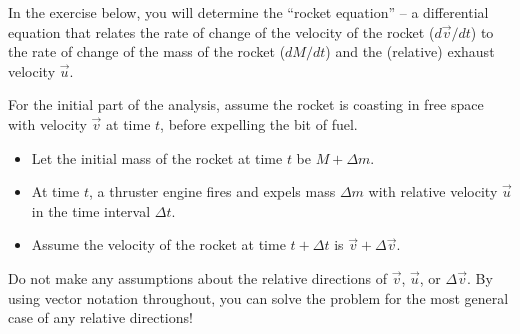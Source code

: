 \documentclass[11pt, letterpaper, openany]{book}
\begin{document}
In the exercise below, you will determine the ``rocket equation'' -- a differential equation that relates the rate of change of the velocity of the rocket ($d\vec{v}/dt$) to the rate of change of the mass of the rocket ($dM/dt$) and the (relative) exhaust velocity $\vec{u}$.

For the initial part of the analysis, assume the rocket is coasting in free space with velocity $\vec{v}$ at time $t$, before expelling the bit of fuel.
\begin{itemize}
    \item Let the initial mass of the rocket at time $t$ be $M + \Delta m$.
    \item At time $t$, a thruster engine fires and expels mass $\Delta m$ with relative velocity $\vec{u}$ in the time interval $\Delta t$.
    \item Assume the velocity of the rocket at time $t + \Delta t$ is $\vec{v} + \Delta\vec{v}$.
\end{itemize}

Do not make any assumptions about the relative directions of $\vec{v}$, $\vec{u}$, or $\Delta\vec{v}$. By using vector notation throughout, you can solve the problem for the most general case of any relative directions!
\end{document}
